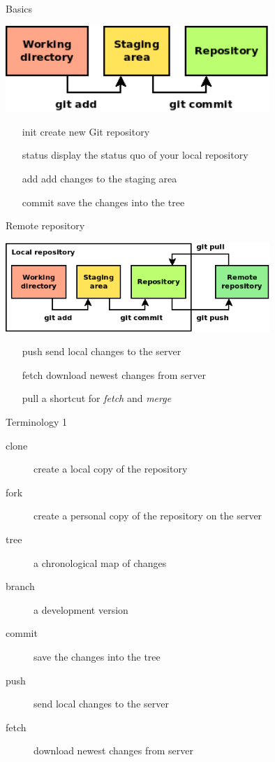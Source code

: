 \documentclass[14pt]{beamer}
\begin{document}
	\begin{frame}{Basics}
        \begin{center}
	    \includegraphics[width=10cm]{commit.png}
        \end{center}
		\begin{itemize}
		\item[init] create new Git repository
		\item[status] display the status quo of your local repository
		\item[add] add changes to the staging area
		\item[commit] save the changes into the tree
		\end{itemize}
	\end{frame}

	\begin{frame}{Remote repository}
        \begin{center}
	    \includegraphics[width=10cm]{remote.png}
        \end{center}
		\begin{itemize}
		\item[push] send local changes to the server
		\item[fetch] download newest changes from server
		\item[pull] a shortcut for \textit{fetch} and \textit{merge} %
		\end{itemize}
	\end{frame}

	\begin{frame}{Terminology 1}
	\begin{description}
		\item[clone] create a local copy of the repository
		\item[fork] create a personal copy of the repository on the server 
		\item[tree] a chronological map of changes
		\item[branch] a development version
		\item[commit] save the changes into the tree
		\item[push] send local changes to the server
		\item[fetch] download newest changes from server
	\end{description}
	\end{frame}
\end{document}
